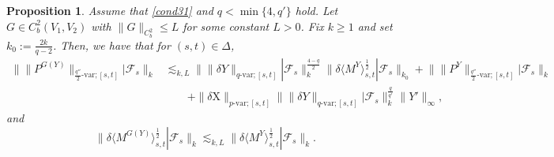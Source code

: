 \documentclass[11pt,reqno]{amsart}
\newtheorem{proposition}[lemma]{Proposition}
\numberwithin{equation}{section}
\begin{document}
\begin{proposition}\label{prop:G(Y) in D}
Assume that \eqref{cond31} and $q < \min\{4,q'\}$ hold. Let $G\in C_b^2(V_1,V_2)$ with
$\|G\|_{C_b^2}\le L$ for some constant $L>0$. Fix $k\ge1$ and set
$k_0:=\frac{2k}{q-2}$. Then, we have that for $(s,t) \in \Delta$, 
\begin{align}\nonumber
\big\| \|P^{G(Y)}\|_{\frac{q''}{2}\text{-}\mathrm{var};[s,t]} | \mathcal F_{s} \big\|_{k} 
& \lesssim_{k, L} \big\| \|\delta Y\|_{q\text{-}\mathrm{var};[s,t]} | \mathcal F_{s} \big\|^{\frac{4-q}{2}}_{k} \big\| \delta \langle M^{Y}\rangle^{\frac{1}{2}}_{s,t} | \mathcal F_{s} \big\|_{k_0} + \big\|\|P^{Y}\|_{\frac{q''}{2}\text{-}\mathrm{var};[s,t]} | \mathcal F_{s}\big\|_{k} \\  \label{e:R^G(Y)}
&\qquad + \|\delta \mathrm X\|_{p\text{-}\mathrm{var};[s,t]}\big\| \|\delta Y\|_{q\text{-}\mathrm{var};[s,t]} | \mathcal F_{s} \big\|^{\frac{q}{q'}}_{k} \|Y'\|_{\infty} ,
\end{align}
and
\begin{equation}\label{e:M^G(Y)}
\big\|\delta \langle M^{G(Y)}\rangle^{\frac{1}{2}}_{s,t} | \mathcal F_{s}\big\|_{k}\lesssim_{k,L} \big\|\delta \langle M^{Y}\rangle^{\frac{1}{2}}_{s,t} | \mathcal F_{s} \big\|_{k}.
\end{equation}
\end{proposition}
\end{document}
